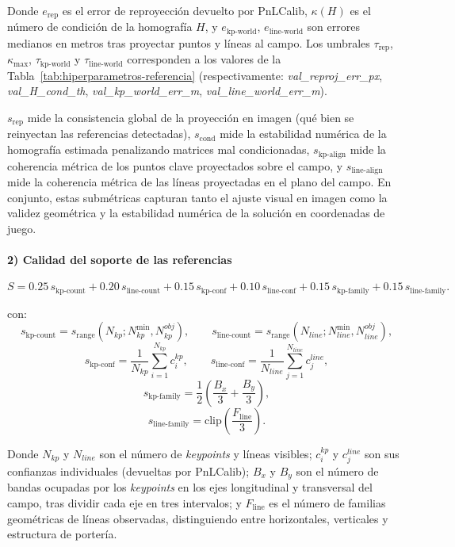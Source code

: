 Donde \(e_{\text{rep}}\) es el error de reproyección devuelto por PnLCalib, \(\kappa(H)\) es el número de condición de la homografía \(H\), y \(e_{\text{kp-world}}\), \(e_{\text{line-world}}\) son errores medianos en metros tras proyectar puntos y líneas al campo. Los umbrales \(\tau_{\text{rep}}\), \(\kappa_{\max}\), \(\tau_{\text{kp-world}}\) y \(\tau_{\text{line-world}}\) corresponden a los valores de la Tabla~\ref{tab:hiperparametros-referencia} (respectivamente: \textit{val\_reproj\_err\_px}, \textit{val\_H\_cond\_th}, \textit{val\_kp\_world\_err\_m}, \textit{val\_line\_world\_err\_m}).

\(s_{\text{rep}}\) mide la consistencia global de la proyección en imagen (qué bien se reinyectan las referencias detectadas), \(s_{\text{cond}}\) mide la estabilidad numérica de la homografía estimada penalizando matrices mal condicionadas, \(s_{\text{kp-align}}\) mide la coherencia métrica de los puntos clave proyectados sobre el campo, y \(s_{\text{line-align}}\) mide la coherencia métrica de las líneas proyectadas en el plano del campo. En conjunto, estas submétricas capturan tanto el ajuste visual en imagen como la validez geométrica y la estabilidad numérica de la solución en coordenadas de juego.


\paragraph{2) Calidad del soporte de las referencias}
\[
S =
0.25\,s_{\text{kp-count}}
+ 0.20\,s_{\text{line-count}}
+ 0.15\,s_{\text{kp-conf}}
+ 0.10\,s_{\text{line-conf}}
+ 0.15\,s_{\text{kp-family}}
+ 0.15\,s_{\text{line-family}}.
\]

con:
\[
s_{\text{kp-count}}=
s_{\text{range}}(N_{kp};N_{kp}^{\min},N_{kp}^{obj}),\qquad
s_{\text{line-count}}=
s_{\text{range}}(N_{line};N_{line}^{\min},N_{line}^{obj}),
\]
\[
s_{\text{kp-conf}}=\frac{1}{N_{kp}}\sum_{i=1}^{N_{kp}} c^{kp}_i,\qquad
s_{\text{line-conf}}=\frac{1}{N_{line}}\sum_{j=1}^{N_{line}} c^{line}_j,
\]
\[
s_{\text{kp-family}}
=
\frac{1}{2}\left(\frac{B_x}{3}+\frac{B_y}{3}\right),
\]
\[
s_{\text{line-family}}
=
\mathrm{clip}\!\left(\frac{F_{\text{line}}}{3}\right).
\]

Donde \(N_{kp}\) y \(N_{line}\) son el número de \textit{keypoints} y líneas visibles; \(c^{kp}_i\) y \(c^{line}_j\) son sus confianzas individuales (devueltas por PnLCalib); \(B_x\) y \(B_y\) son el número de bandas ocupadas por los \textit{keypoints} en los ejes longitudinal y transversal del campo, tras dividir cada eje en tres intervalos; y \(F_{\text{line}}\) es el número de familias geométricas de líneas observadas, distinguiendo entre horizontales, verticales y estructura de portería.

